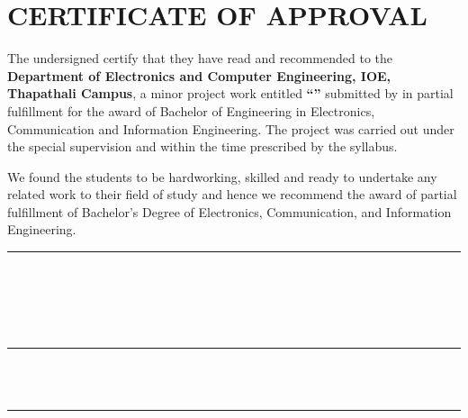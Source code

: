 \chapter*{CERTIFICATE OF APPROVAL}
{}

\noindent The undersigned certify that they have read and recommended to the
\textbf{Department of Electronics and Computer Engineering, IOE, Thapathali Campus},
a minor project work entitled \textbf{``\cTitle''} submitted by
\textbf{\authorList} in partial fulfillment for the award of Bachelor of
Engineering in Electronics, Communication and Information Engineering.
The project was carried out under the special supervision and within the time
prescribed by the syllabus.

\vspace{1em}

We found the students to be hardworking, skilled and ready to undertake
any related work to their field of study and hence we recommend the award of
partial fulfillment of Bachelor's Degree of Electronics, Communication, and
Information Engineering.

\vspace{2em}

\noindent
\begin{minipage}[t]{0.48\textwidth}
    \rule{6cm}{0.2mm} \\
    \cSupervisorTitle \\
    \cSupervisor \\
    \cSupervisorDept \\
    \cSupervisorAddress
\end{minipage}
\hfill
\begin{minipage}[t]{0.48\textwidth}
    \rule{6cm}{0.2mm} \\
    \cExternalExaminer \\
\end{minipage}

\vspace{3em}

\noindent
\begin{minipage}[t]{0.48\textwidth}
    \rule{6cm}{0.2mm} \\
    \cHODTitle \\
    \cHOD \\
    \cHODDept \\
    \cHODAddress
\end{minipage}

\vspace{2em}

\noindent\cDate
